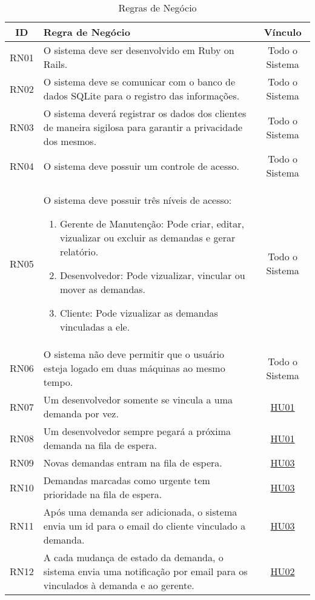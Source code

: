 \begin{table}[H]
	\begin{tabular}{|c|>{\centering}p{12cm}|c|}
		\hline
		ID & Regra de Negócio & Vínculo\tabularnewline
		\hline
		\hline
		RN01 & O sistema deve ser desenvolvido em Ruby on Rails. & Todo o Sistema\tabularnewline
		\hline
		RN02 & O sistema deve se comunicar com o banco de dados SQLite para o registro
		das informações. & Todo o Sistema\tabularnewline
		\hline
		RN03 & O sistema deverá registrar os dados dos clientes de maneira sigilosa
		para garantir a privacidade dos mesmos. & Todo o Sistema\tabularnewline
		\hline
		RN04 & O sistema deve possuir um controle de acesso. & Todo o Sistema\tabularnewline
		\hline
		RN05 & O sistema deve possuir três níveis de acesso:
		\begin{enumerate}
			\item Gerente de Manutenção: Pode criar, editar, vizualizar ou excluir as demandas e gerar relatório.
			\item Desenvolvedor: Pode vizualizar, vincular ou mover as demandas.
			\item Cliente: Pode vizualizar as demandas vinculadas a ele.
		\end{enumerate} & Todo o Sistema\tabularnewline
		\hline
		RN06 & O sistema não deve permitir que o usuário esteja logado em duas máquinas
		ao mesmo tempo. & Todo o Sistema\tabularnewline
		\hline
		RN07 & Um desenvolvedor somente se vincula a uma demanda por vez. & \hyperref[HU01]{HU01}\tabularnewline
		\hline
		RN08 & Um desenvolvedor sempre pegará a próxima demanda na fila de espera. & \hyperref[HU01]{HU01}\tabularnewline
		\hline
		RN09 & Novas demandas entram na fila de espera. & \hyperref[HU03]{HU03}\tabularnewline
		\hline
		RN10 & Demandas marcadas como urgente tem prioridade na fila de espera. & \hyperref[HU03]{HU03}\tabularnewline
		\hline
		RN11 & Após uma demanda ser adicionada, o sistema envia um id para o email
		do cliente vinculado a demanda. & \hyperref[HU03]{HU03}\tabularnewline
		\hline
		RN12 & A cada mudança de estado da demanda, o sistema envia uma notificação
		por email para os vinculados à demanda e ao gerente. & \hyperref[HU02]{HU02}\tabularnewline
		\hline
	\end{tabular}
	\caption{Regras de Negócio}
	\label{Regra_de_Negocio}
\end{table}
